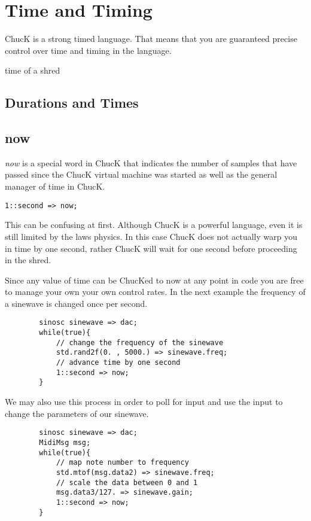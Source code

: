 \chapter{Time and Timing}

ChucK is a strong timed language. That means that you are guaranteed precise control over time and timing in the language. 

time of a shred


\section{Durations and Times}


\section{now}

{\it now} is a special word in ChucK that indicates the number of samples that have passed since the ChucK virtual machine was started as well as the general manager of time in ChucK.

\begin{verbatim}
1::second => now;
\end{verbatim}

This can be confusing at first. Although ChucK is a powerful language, even it is still limited by the laws physics. In this case ChucK does not actually warp you in time by one second, rather ChucK will wait for one second before proceeding in the shred. 

Since any value of time can be ChucKed to now at any point in code you are free to manage your own your own control rates. In the next example the frequency of a sinewave is changed once per second. 

\begin{verbatim}
        sinosc sinewave => dac;
        while(true){
            // change the frequency of the sinewave
            std.rand2f(0. , 5000.) => sinewave.freq;
            // advance time by one second
            1::second => now;
        }
\end{verbatim}

We may also use this process in order to poll for input and use the input to change the parameters of our sinewave.

\begin{verbatim}
        sinosc sinewave => dac;
        MidiMsg msg;
        while(true){
            // map note number to frequency		
            std.mtof(msg.data2) => sinewave.freq;
            // scale the data between 0 and 1
            msg.data3/127. => sinewave.gain;
            1::second => now;
        }
\end{verbatim}


